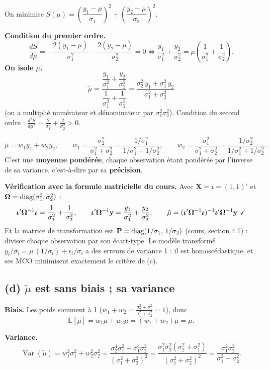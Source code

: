 \documentclass[11pt,a4paper]{article}
\newcommand{\vy}{\mathbf{y}}\newcommand{\vX}{\mathbf{X}}\newcommand{\vi}{\bm{\iota}}
\newcommand{\E}{\mathbb{E}}\newcommand{\Var}{\operatorname{Var}}\newcommand{\Cov}{\operatorname{Cov}}
\begin{document}
On minimise $S(\mu)=\left(\dfrac{y_1-\mu}{\sigma_1}\right)^2+\left(\dfrac{y_2-\mu}{\sigma_2}\right)^2$.

\textbf{Condition du premier ordre.}
\[
\frac{dS}{d\mu}=-\frac{2(y_1-\mu)}{\sigma_1^2}-\frac{2(y_2-\mu)}{\sigma_2^2}=0
\iff \frac{y_1}{\sigma_1^2}+\frac{y_2}{\sigma_2^2}=\mu\left(\frac1{\sigma_1^2}+\frac1{\sigma_2^2}\right).
\]
\textbf{On isole $\mu$.}
\[
\tilde\mu=\frac{\dfrac{y_1}{\sigma_1^2}+\dfrac{y_2}{\sigma_2^2}}{\dfrac1{\sigma_1^2}+\dfrac1{\sigma_2^2}}
=\frac{\sigma_2^2\,y_1+\sigma_1^2\,y_2}{\sigma_1^2+\sigma_2^2}
\]
(on a multiplié numérateur et dénominateur par $\sigma_1^2\sigma_2^2$). Condition du second ordre : $\frac{d^2S}{d\mu^2}=\frac2{\sigma_1^2}+\frac2{\sigma_2^2}>0$.

\begin{reponse}
\[
\tilde\mu=w_1y_1+w_2y_2,\qquad
w_1=\frac{\sigma_2^2}{\sigma_1^2+\sigma_2^2}=\frac{1/\sigma_1^2}{1/\sigma_1^2+1/\sigma_2^2},\qquad
w_2=\frac{\sigma_1^2}{\sigma_1^2+\sigma_2^2}=\frac{1/\sigma_2^2}{1/\sigma_1^2+1/\sigma_2^2}.
\]
C'est une \textbf{moyenne pondérée}, chaque observation étant pondérée par l'inverse de sa variance, c'est-à-dire par sa \textbf{précision}.
\end{reponse}

\textbf{Vérification avec la formule matricielle du cours.} Avec $\vX=\vi=(1,1)'$ et $\bm{\Omega}=\text{diag}(\sigma_1^2,\sigma_2^2)$ :
\[
\vi'\Om^{-1}\vi=\frac1{\sigma_1^2}+\frac1{\sigma_2^2},\qquad
\vi'\Om^{-1}\vy=\frac{y_1}{\sigma_1^2}+\frac{y_2}{\sigma_2^2},\qquad
\tilde\mu=(\vi'\Om^{-1}\vi)^{-1}\vi'\Om^{-1}\vy\ \checkmark
\]
Et la matrice de transformation est $\mathbf{P}=\text{diag}(1/\sigma_1,\,1/\sigma_2)$ (cours, section 4.1) : diviser chaque observation par son écart-type. Le modèle transformé $y_i/\sigma_i=\mu\,(1/\sigma_i)+\epsilon_i/\sigma_i$ a des erreurs de variance 1 : il est homoscédastique, et ses MCO minimisent exactement le critère de (c).

\subsection*{(d) $\tilde\mu$ est sans biais ; sa variance}

\textbf{Biais.} Les poids somment à 1 ($w_1+w_2=\frac{\sigma_2^2+\sigma_1^2}{\sigma_1^2+\sigma_2^2}=1$), donc
\[
\E[\tilde\mu]=w_1\mu+w_2\mu=(w_1+w_2)\mu=\mu .
\]

\textbf{Variance.}
\[
\Var(\tilde\mu)=w_1^2\sigma_1^2+w_2^2\sigma_2^2
=\frac{\sigma_2^4\sigma_1^2+\sigma_1^4\sigma_2^2}{(\sigma_1^2+\sigma_2^2)^2}
=\frac{\sigma_1^2\sigma_2^2(\sigma_2^2+\sigma_1^2)}{(\sigma_1^2+\sigma_2^2)^2}
=\frac{\sigma_1^2\sigma_2^2}{\sigma_1^2+\sigma_2^2}.
\]
\end{document}
